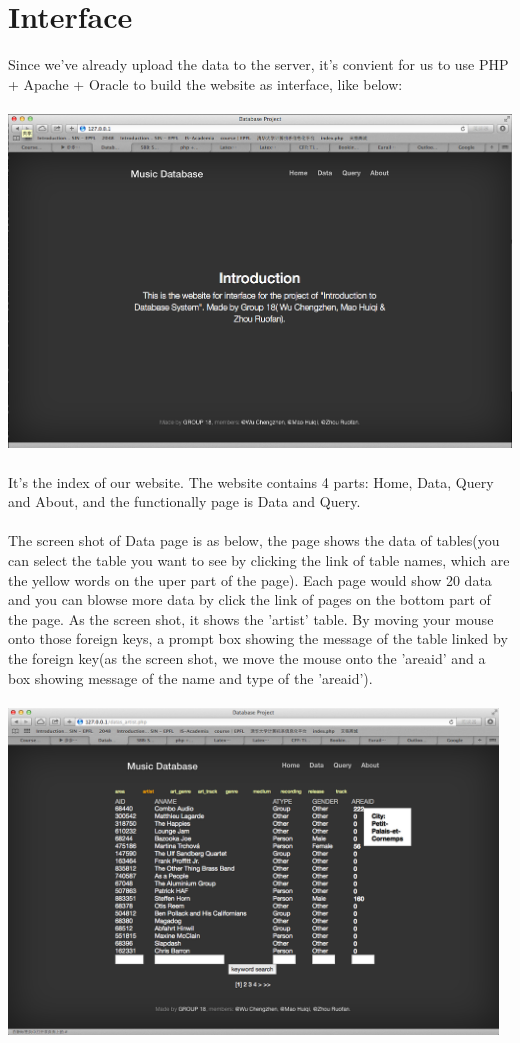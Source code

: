 \documentclass[11pt]{article} %
\begin{document}
{\section{Interface}
Since we've already upload the data to the server, it's convient for us to use PHP + Apache + Oracle to build the website as interface, like below:\\ \\
\includegraphics[width=14cm]{interface1}\\ \\
It's the index of our website. The website contains 4 parts: Home, Data, Query and About, and the functionally page is Data and Query.\\ \\
The screen shot of Data page is as below, the page shows the data of tables(you can select the table you want to see by clicking the link of table names, which are the yellow words on the uper part of the page). Each page would show 20 data and you can blowse more data by click the link of pages on the bottom part of the page. As the screen shot, it shows the 'artist' table. By moving your mouse onto those foreign keys, a prompt box showing the message of the table linked by the foreign key(as the screen shot, we move the mouse onto the 'areaid' and a box showing message of the name and type of the 'areaid').\\ \\
\includegraphics[width=13cm]{interface2}\\ \\
}
\end{document}
